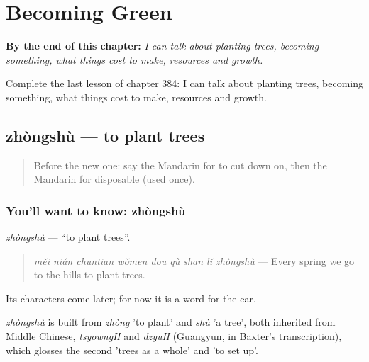 
\chapter{Becoming Green}
\label{ch:zh-becoming-green}

\begin{chapteropening}
\textbf{By the end of this chapter:} \emph{I can talk about planting trees, becoming something, what things cost to make, resources and growth.}

Complete the last lesson of chapter 384: I can talk about planting trees, becoming something, what things cost to make, resources and growth.
\end{chapteropening}

\section[zhòngshù]{zhòngshù — to plant trees}

\label{lesson:ZH-C384-zhongshu}



\begin{quote}
Before the new one: say the Mandarin for to cut down on, then the Mandarin for disposable (used once).
\end{quote}

\subsection*{You'll want to know: zhòngshù}
\emph{zhòngshù} — \textquotedblleft{}to plant trees\textquotedblright{}.

\begin{quote}
\emph{měi nián chūntiān wǒmen dōu qù shān lǐ zhòngshù} — Every spring we go to the hills to plant trees.
\end{quote}

Its characters come later; for now it is a word for the ear.

\begin{cousinweb}
\emph{zhòngshù} is built from \emph{zhòng} 'to plant' and \emph{shù} 'a tree', both inherited from Middle Chinese, \emph{tsyowngH} and \emph{dzyuH} (Guangyun, in Baxter's transcription), which glosses the second 'trees as a whole' and 'to set up'.
\end{cousinweb}

